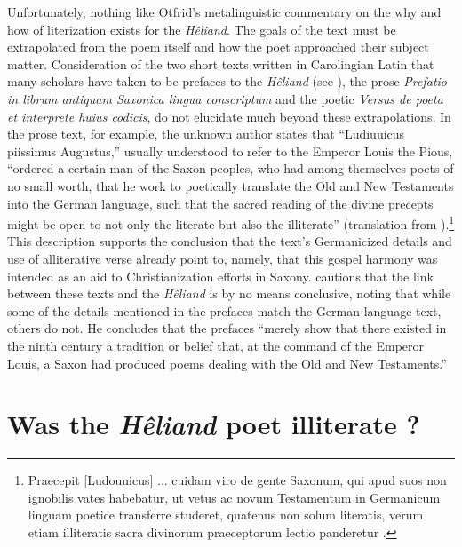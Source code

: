 Unfortunately, nothing like Otfrid’s metalinguistic commentary on the why and how of literization exists for the \textit{Hêliand}. The goals of the text must be extrapolated from the poem itself and how the poet approached their subject matter. Consideration of the two short texts written in Carolingian Latin that many scholars have taken to be prefaces to the \textit{Hêliand} (see \citealt[181--182]{Bostock1976}), the prose \textit{Prefatio in librum antiquam Saxonica lingua conscriptum} and the poetic \textit{Versus de poeta et interprete huius codicis}, do not elucidate much beyond these extrapolations. In the prose text, for example, the unknown author states that “Ludiuuicus piissimus Augustus,” usually understood to refer to the Emperor Louis the Pious, “ordered a certain man of the Saxon peoples, who had among themselves poets of no small worth, that he work to poetically translate the Old and New Testaments into the German language, such that the sacred reading of the divine precepts might be open to not only the literate but also the illiterate” (translation from \citealt{Carlton2019}).\footnote{Praecepit [Ludouuicus] ... cuidam viro de gente Saxonum, qui apud suos non ignobilis vates habebatur, ut vetus ac novum Testamentum in Germanicum linguam poetice transferre studeret, quatenus non solum literatis, verum etiam illiteratis sacra divinorum praeceptorum lectio panderetur \citep[3]{Sievers1935}.} This description supports the conclusion that the text’s Germanicized details and use of alliterative verse already point to, namely, that this gospel harmony was intended as an aid to Christianization efforts in Saxony. \citet[183]{Bostock1976} cautions that the link between these texts and the \textit{Hêliand} is by no means conclusive, noting that while some of the details mentioned in the prefaces match the German-language text, others do not. He concludes that the prefaces “merely show that there existed in the ninth century a tradition or belief that, at the command of the Emperor Louis, a Saxon had produced poems dealing with the Old and New Testaments.”

\section{Was the \textit{Hêliand} poet illiterate \citep{Haferland2010}?}\label{sec:5.3.1}\largerpage

